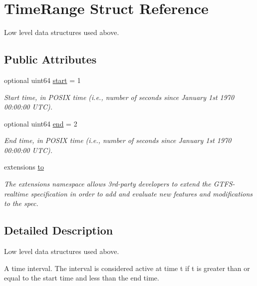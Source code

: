 \hypertarget{structTimeRange}{}\section{Time\+Range Struct Reference}
\label{structTimeRange}


Low level data structures used above.  


\subsection*{Public Attributes}
\begin{DoxyCompactItemize}
\item 
optional uint64 \hyperlink{structTimeRange_a58a6afe3f10babe6dcbaf203fb83c26c}{start} = 1
\begin{DoxyCompactList}\small\item\em Start time, in P\+O\+S\+IX time (i.\+e., number of seconds since January 1st 1970 00\+:00\+:00 U\+TC). \end{DoxyCompactList}\item 
optional uint64 \hyperlink{structTimeRange_ada44c45a7e5419e7dbc7322f56002a32}{end} = 2
\begin{DoxyCompactList}\small\item\em End time, in P\+O\+S\+IX time (i.\+e., number of seconds since January 1st 1970 00\+:00\+:00 U\+TC). \end{DoxyCompactList}\item 
extensions \hyperlink{structTimeRange_ac6a65d679a5abc8bfaf635d9258e1ef6}{to}
\begin{DoxyCompactList}\small\item\em The extensions namespace allows 3rd-\/party developers to extend the G\+T\+F\+S-\/realtime specification in order to add and evaluate new features and modifications to the spec. \end{DoxyCompactList}\end{DoxyCompactItemize}


\subsection{Detailed Description}
Low level data structures used above. 

A time interval. The interval is considered active at time \textquotesingle{}t\textquotesingle{} if \textquotesingle{}t\textquotesingle{} is greater than or equal to the start time and less than the end time. 


